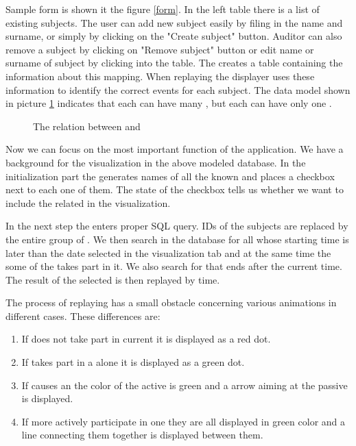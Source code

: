 Sample form is shown it the figure \ref{form}. In the left table there is a list of existing subjects. The user can add new subject easily by filing in the name and surname, or simply by clicking on the "Create subject" button. Auditor can also remove a subject by clicking on "Remove subject" button or edit name or surname of subject by clicking into the table. The  creates a table containing the information about this mapping. When replaying the displayer uses these information to identify the correct events for each subject. The data model shown in picture \ref{model-displayer} indicates that each  can have many , but each  can have only one .

\begin{figure}[!h]
    \centering 
    
    \epsfysize=40mm 
    \caption{The relation between  and }\label{model-displayer}
\end{figure}

Now we can focus on the most important function of the application. We have a background for the visualization in the above modeled database. In the initialization part the  generates names of all the known  and places a checkbox next to each one of them. The state of the checkbox tells us whether we want to include the related  in the visualization. 

In the next step the  enters proper SQL query. IDs of the subjects are replaced by the entire group of . We then search in the database for all  whose starting time is later than the date selected in the visualization tab and at the same time the some of the  takes part in it. We also search for    that ends after the current time. The result of the  selected   is then replayed by time. 

The process of replaying has a small obstacle concerning various animations in different cases. These differences are:
\begin{enumerate}
\item If  does not take part in current  it is displayed as a red dot.
\item If  takes part in a  alone it is displayed as a green dot.
\item If  causes an  the color of the active  is green and a arrow aiming at the passive  is displayed. 
\item If more  actively participate in one  they are all displayed in green color and a line connecting them together is displayed between them. 
\end{enumerate}

